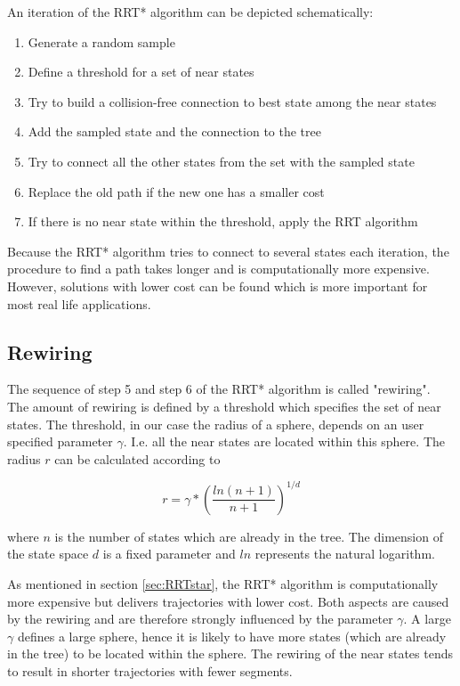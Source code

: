 An iteration of the RRT* algorithm can be depicted schematically:


\begin{enumerate}
  \item Generate a random sample
  \item Define a threshold for a set of near states
  \item Try to build a collision-free connection to best state among the near states
  \item Add the sampled state and the connection to the tree 
  \item Try to connect all the other states from the set with the sampled state 
  \item Replace the old path if the new one has a smaller cost
  \item If there is no near state within the threshold, apply the RRT algorithm
\end{enumerate}


Because the RRT* algorithm tries to connect to several states each iteration, the procedure to find a path takes longer and is computationally more expensive. However, solutions with lower cost can be found which is more important for most real life applications.

\subsection{Rewiring}

The sequence of step 5 and step 6 of the RRT* algorithm is called "rewiring". The amount of rewiring is defined by a threshold which specifies the set of near states. The threshold, in our case the radius of a sphere, depends on an user specified parameter $\gamma$. I.e. all the near states are located within this sphere. The radius $r$ can be calculated according to


\begin{equation}
r = \gamma * \left(\frac{ln(n+1)}{n+1}\right)^{1/d}
\label{equ:ballradius}
\end{equation}

where $n$ is the number of states which are already in the tree. The dimension of the state space $d$ is a fixed parameter and $ln$ represents the natural logarithm.\newline

As mentioned in section \ref{sec:RRTstar}, the RRT* algorithm is computationally more expensive but delivers trajectories with lower cost. Both aspects are caused by the rewiring and are therefore strongly influenced by the parameter $\gamma$. A large $\gamma$ defines a large sphere, hence it is likely to have more states (which are already in the tree) to be located within the sphere. The rewiring of the near states tends to result in shorter trajectories with fewer segments.\newline


